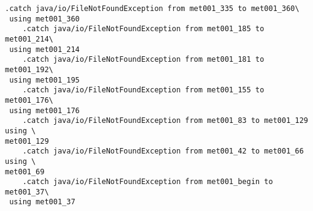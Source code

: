 
\begin{lstlisting}[caption=\EN{from some random .class file I found on my computer}\RU{из какого-то случайного найденного на моем компьютере .class-файла}]
    .catch java/io/FileNotFoundException from met001_335 to met001_360\
 using met001_360
    .catch java/io/FileNotFoundException from met001_185 to met001_214\
 using met001_214
    .catch java/io/FileNotFoundException from met001_181 to met001_192\
 using met001_195
    .catch java/io/FileNotFoundException from met001_155 to met001_176\
 using met001_176
    .catch java/io/FileNotFoundException from met001_83 to met001_129 using \
met001_129
    .catch java/io/FileNotFoundException from met001_42 to met001_66 using \
met001_69
    .catch java/io/FileNotFoundException from met001_begin to met001_37\
 using met001_37
\end{lstlisting}
